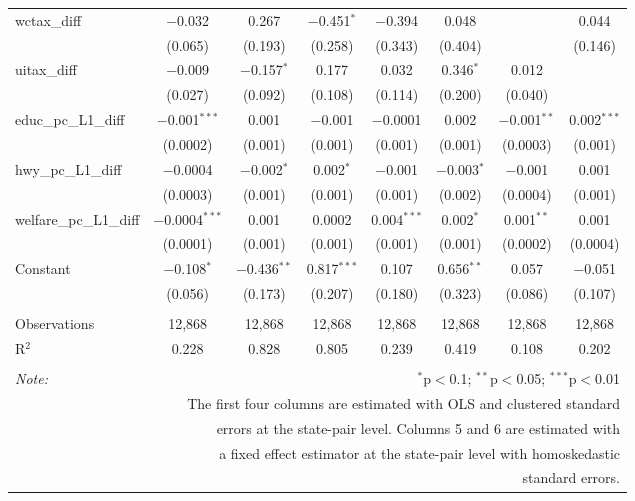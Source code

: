 \begin{table}[!htbp]
\begin{tabular}{@{\extracolsep{5pt}}lccccccc}
  wctax\_diff & $-$0.032 & 0.267 & $-$0.451$^{*}$ & $-$0.394 & 0.048 &  & 0.044 \\ 
  & (0.065) & (0.193) & (0.258) & (0.343) & (0.404) &  & (0.146) \\ 
  uitax\_diff & $-$0.009 & $-$0.157$^{*}$ & 0.177 & 0.032 & 0.346$^{*}$ & 0.012 &  \\ 
  & (0.027) & (0.092) & (0.108) & (0.114) & (0.200) & (0.040) &  \\ 
  educ\_pc\_L1\_diff & $-$0.001$^{***}$ & 0.001 & $-$0.001 & $-$0.0001 & 0.002 & $-$0.001$^{**}$ & 0.002$^{***}$ \\ 
  & (0.0002) & (0.001) & (0.001) & (0.001) & (0.001) & (0.0003) & (0.001) \\ 
  hwy\_pc\_L1\_diff & $-$0.0004 & $-$0.002$^{*}$ & 0.002$^{*}$ & $-$0.001 & $-$0.003$^{*}$ & $-$0.001 & 0.001 \\ 
  & (0.0003) & (0.001) & (0.001) & (0.001) & (0.002) & (0.0004) & (0.001) \\ 
  welfare\_pc\_L1\_diff & $-$0.0004$^{***}$ & 0.001 & 0.0002 & 0.004$^{***}$ & 0.002$^{*}$ & 0.001$^{**}$ & 0.001 \\ 
  & (0.0001) & (0.001) & (0.001) & (0.001) & (0.001) & (0.0002) & (0.0004) \\ 
  Constant & $-$0.108$^{*}$ & $-$0.436$^{**}$ & 0.817$^{***}$ & 0.107 & 0.656$^{**}$ & 0.057 & $-$0.051 \\ 
  & (0.056) & (0.173) & (0.207) & (0.180) & (0.323) & (0.086) & (0.107) \\ 
 \hline \\[-1.8ex] 
Observations & 12,868 & 12,868 & 12,868 & 12,868 & 12,868 & 12,868 & 12,868 \\ 
R$^{2}$ & 0.228 & 0.828 & 0.805 & 0.239 & 0.419 & 0.108 & 0.202 \\ 
\hline 
\hline \\[-1.8ex] 
\textit{Note:}  & \multicolumn{7}{r}{$^{*}$p$<$0.1; $^{**}$p$<$0.05; $^{***}$p$<$0.01} \\ 
 & \multicolumn{7}{r}{The first four columns are estimated with OLS and clustered standard} \\ 
 & \multicolumn{7}{r}{ errors at the state-pair level. Columns 5 and 6 are estimated with} \\ 
 & \multicolumn{7}{r}{a fixed effect estimator at the state-pair level with homoskedastic} \\ 
 & \multicolumn{7}{r}{standard errors.} \\ 
\end{tabular} 
\end{table} 
